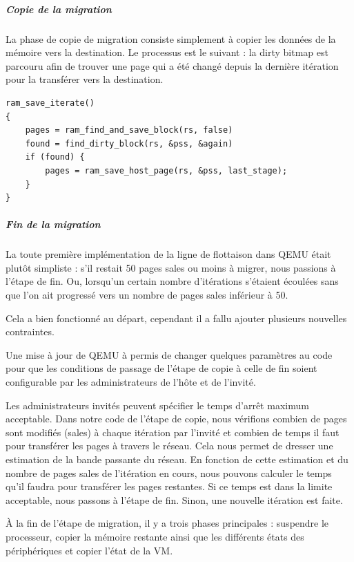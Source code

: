 \subparagraph*{Copie de la migration}
La phase de copie de migration consiste simplement à copier les données de la mémoire vers la destination.
Le processus est le suivant :
la dirty bitmap est parcouru afin de trouver une page qui a été changé depuis la dernière itération pour la transférer vers la destination.
\begin{lstlisting}[caption={Code responsable de la phase de copie},captionpos=b]
ram_save_iterate()
{
  	pages = ram_find_and_save_block(rs, false)
    found = find_dirty_block(rs, &pss, &again)
    if (found) {
        pages = ram_save_host_page(rs, &pss, last_stage);
    }
}
\end{lstlisting}

\subparagraph*{Fin de la migration}
La toute première implémentation de la ligne de flottaison dans QEMU était plutôt simpliste : s'il restait 50 pages sales ou moins à migrer, nous passions à l'étape de fin.
Ou, lorsqu'un certain nombre d'itérations s'étaient écoulées sans que l'on ait progressé vers un nombre de pages sales inférieur à 50.

Cela a bien fonctionné au départ, cependant il a fallu ajouter plusieurs nouvelles contraintes.

Une mise à jour de QEMU à permis de changer quelques paramètres au code pour que les conditions de passage de l'étape de copie à celle de fin soient configurable par les administrateurs de l'hôte et de l'invité.

Les administrateurs invités peuvent spécifier le temps d'arrêt maximum acceptable.
Dans notre code de l'étape de copie, nous vérifions combien de pages sont modifiés (sales) à chaque itération par l'invité et combien de temps il faut pour transférer les pages à travers le réseau.
Cela nous permet de dresser une estimation de la bande passante du réseau.
En fonction de cette estimation et du nombre de pages sales de l'itération en cours, nous pouvons calculer le temps qu'il faudra pour transférer les pages restantes.
Si ce temps est dans la limite acceptable, nous passons à l'étape de fin.
Sinon, une nouvelle itération est faite. \cite{redhat}

À la fin de l'étape de migration, il y a trois phases principales : suspendre le processeur, copier la mémoire restante ainsi que les différents états des périphériques et copier l'état de la VM.

